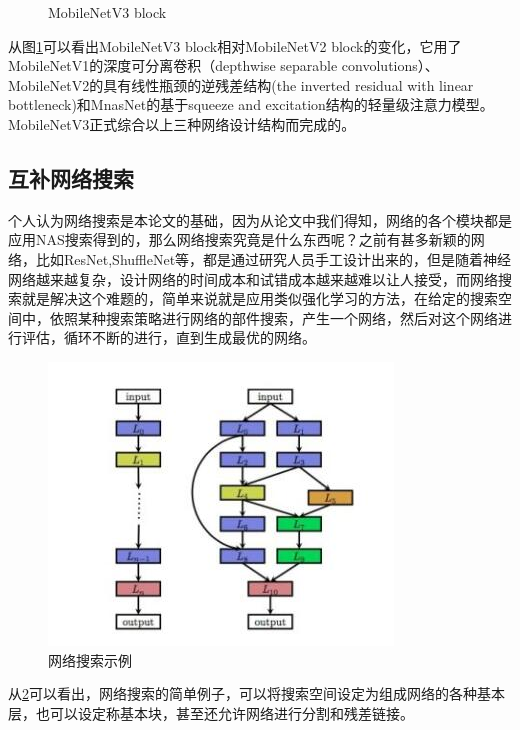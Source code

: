 \documentclass[UTF8,a4paper,12pt]{ctexart}
\begin{document}
 \begin{figure}[htbp]
	\centering
	\quad
	\caption{MobileNetV3 block}
	\label{fig-MobileNetV3 block}
\end{figure}

从图\ref{fig-MobileNetV3 block}可以看出MobileNetV3 block相对MobileNetV2 block的变化，它用了MobileNetV1\cite{2017MobileNets}的深度可分离卷积（depthwise separable convolutions）、MobileNetV2\cite{MOBV2}的具有线性瓶颈的逆残差结构(the inverted residual with linear bottleneck)和MnasNet\cite{MnasNet}的基于squeeze and excitation结构的轻量级注意力模型。MobileNetV3正式综合以上三种网络设计结构而完成的。

\subsection{互补网络搜索}
个人认为网络搜索是本论文的基础，因为从论文中我们得知，网络的各个模块都是应用NAS\cite{MnasNet}搜索得到的，那么网络搜索究竟是什么东西呢？之前有甚多新颖的网络，比如ResNet\cite{resnet,renet2},ShuffleNet\cite{ShuffleNet,ShuffleNet2}等，都是通过研究人员手工设计出来的，但是随着神经网络越来越复杂，设计网络的时间成本和试错成本越来越难以让人接受，而网络搜索就是解决这个难题的，简单来说就是应用类似强化学习的方法，在给定的搜索空间中，依照某种搜索策略进行网络的部件搜索，产生一个网络，然后对这个网络进行评估，循环不断的进行，直到生成最优的网络。

 \begin{figure}[htbp]
	\centering
	\includegraphics[width=0.5\linewidth]{webmin/网路搜索.jpg}
	\caption{网络搜索示例}
	\label{fig-wangluosousuo}
\end{figure}
从\ref{fig-wangluosousuo}可以看出，网络搜索的简单例子，可以将搜索空间设定为组成网络的各种基本层，也可以设定称基本块，甚至还允许网络进行分割和残差链接。
\end{document}
